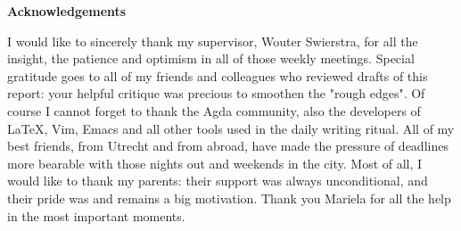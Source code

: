 \clearpage



{\centering \textbf{Acknowledgements}\\[5mm]}

I would like to sincerely thank my supervisor, Wouter Swierstra, for
all the insight, the patience and optimism in all of those weekly meetings.
Special gratitude goes to all of my friends and colleagues who
reviewed drafts of this report: your helpful critique was precious to smoothen the "rough edges".
Of course I cannot forget to thank the Agda community, also
the developers of LaTeX, Vim, Emacs and all other tools used in the daily writing ritual.
All of my best friends, from Utrecht and from abroad, have made the
pressure of deadlines more bearable with those nights out and weekends in the city.
Most of all, I would like to thank my parents: their support was always unconditional,
and their pride was and remains a big motivation.
Thank you Mariela for all the help in the most important moments.

